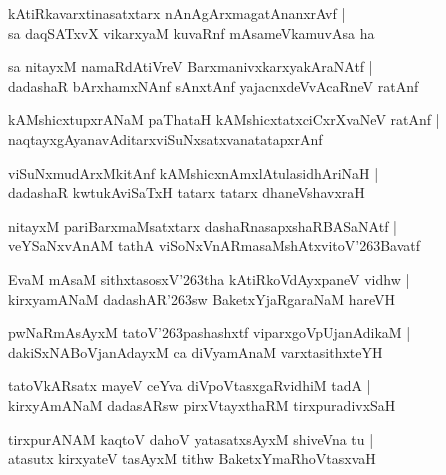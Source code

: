 \documentclass[twoside,12pt,openright]{book}
\def\S{\char'263}
\newcounter{shloka}[chapter]
\begin{document}
\begin{shloka}%
kAtiRkavarxtinasatxtarx nAnAgArxmagatAnanxrAvf |\\
sa daqSATxvX vikarxyaM kuvaRnf mAsameVkamuvAsa ha 
\end{shloka}

\begin{shloka}%
sa nitayxM namaRdAtiVreV BarxmanivxkarxyakAraNAtf |\\
dadashaR bArxhamxNAnf sAnxtAnf yajacnxdeVvAcaRneV ratAnf 
\end{shloka}

\begin{shloka}%
kAMshicxtupxrANaM paThataH kAMshicxtatxciCxrXvaNeV ratAnf |\\
naqtayxgAyanavAditarxviSuNxsatxvanatatapxrAnf 
\end{shloka}

\begin{shloka}%
viSuNxmudArxMkitAnf kAMshicxnAmxlAtulasidhAriNaH |\\
dadashaR kwtukAviSaTxH tatarx tatarx dhaneVshavxraH
\end{shloka}

\begin{shloka}%
nitayxM pariBarxmaMsatxtarx dashaRnasapxshaRBASaNAtf |\\
veYSaNxvAnAM tathA viSoNxVnARmasaMshAtxvitoV\S Bavatf
\end{shloka}

\begin{shloka}%
EvaM mAsaM sithxtasosxV\S tha kAtiRkoVdAyxpaneV vidhw |\\
kirxyamANaM dadashAR\S sw BaketxYjaRgaraNaM hareVH 
\end{shloka}

\begin{shloka}%
pwNaRmAsAyxM tatoV\S pashashxtf viparxgoVpUjanAdikaM |\\
dakiSxNABoVjanAdayxM ca diVyamAnaM varxtasithxteYH
\end{shloka}

\begin{shloka}%
tatoVkARsatx mayeV ceYva diVpoVtasxgaRvidhiM tadA |\\
kirxyAmANaM dadasARsw pirxVtayxthaRM tirxpuradivxSaH
\end{shloka}

\begin{shloka}%
tirxpurANAM kaqtoV dahoV yatasatxsAyxM shiveVna tu |\\
atasutx kirxyateV tasAyxM tithw BaketxYmaRhoVtasxvaH 
\end{shloka}
\end{document}
